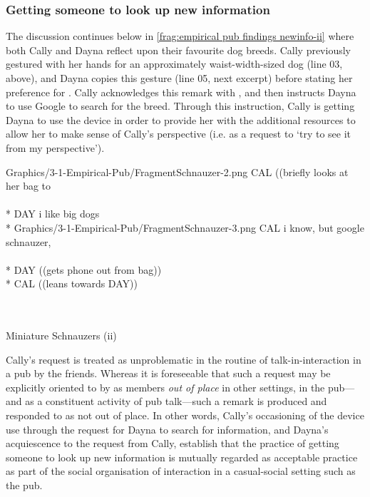 \subsubsection{Getting someone to look up new information}\label{sec:empirical pub findings newinfo getting-someone}
\begin{revisedsubmission}
The discussion continues below in \autoref{frag:empirical pub findings newinfo-ii} where both Cally and Dayna reflect upon their favourite dog breeds.
Cally previously gestured with her hands for an approximately waist-width-sized dog (line 03, above), and Dayna copies this gesture (line 05, next excerpt) before stating her preference for .
Cally acknowledges this remark with , and then instructs Dayna to use Google to search for the breed.
Through this instruction, Cally is getting Dayna to use the device in order to provide her with the additional resources to allow her to make sense of Cally’s perspective (i.e. as a request to `try to see it from my perspective').

\begin{fragfloat*}
    {
    \begin{transcript*}[5]
           {Graphics/3-1-Empirical-Pub/FragmentSchnauzer-2.png}
        \by CAL {((briefly looks at her bag to} \\
         \\*
        \by DAY {i like big dogs\vspace{1.9cm}} \\*
           {Graphics/3-1-Empirical-Pub/FragmentSchnauzer-3.png}
        \by CAL {i know, but google schnauzer,} \\
         \\*
        \by DAY {((gets phone out from bag))} \\*
        \by CAL {((leans towards DAY)) } \\
         \\
         \\
    \end{transcript*}
    \caption{Miniature Schnauzers (ii)}\label{frag:empirical pub findings newinfo-ii}
    }
\end{fragfloat*}

Cally's request is treated as unproblematic in the routine of talk-in-interaction in a pub by the friends.
Whereas it is foreseeable that such a request may be explicitly oriented to by as members \textit{out of place} in other settings, in the pub---and as a constituent activity of pub talk---such a remark is produced and responded to as not out of place.
In other words, Cally’s occasioning of the device use through the request for Dayna to search for information, and Dayna’s acquiescence to the request from Cally, establish that the practice of getting someone to look up new information is mutually regarded as acceptable practice as part of the social organisation of interaction in a casual-social setting such as the pub.
\end{revisedsubmission}
